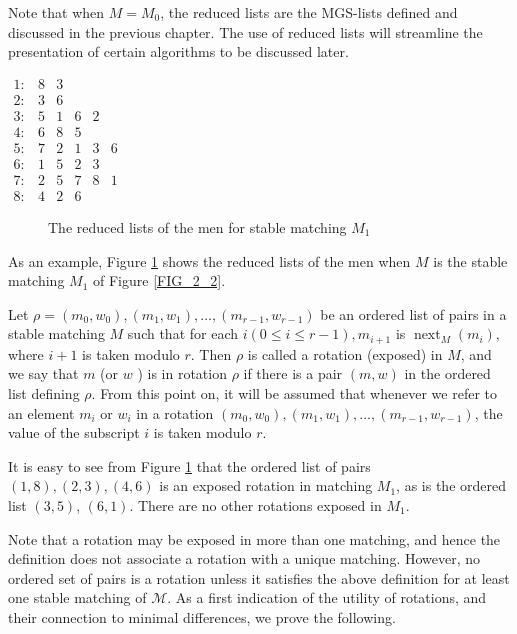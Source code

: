 Note that when $M=M_0$, the reduced lists are the MGS-lists defined and discussed in the previous chapter. The use of reduced lists will streamline the presentation of certain algorithms to be discussed later.

\begin{center}
    $\begin{array}{llllll}
    1: & 8 & 3 & & & \\ 2: & 3 & 6 & & & \\ 3: & 5 & 1 & 6 & 2 & \\ 4: & 6 & 8 & 5 & & \\ 5: & 7 & 2 & 1 & 3 & 6 \\ 6: & 1 & 5 & 2 & 3 &  \\ 7: & 2 & 5 & 7 & 8 & 1 \\ 8: & 4 & 2 & 6 & &\end{array}$
    \begin{figure}[ht]
  \centering
  \caption{The reduced lists of the men for stable matching $M_1$}
  \label{FIG_3_2}
\end{figure}
\end{center}

 As an example, Figure \ref{FIG_3_2} shows the reduced lists of the men when $M$ is the stable matching $M_1$ of Figure \ref{FIG_2_2}.

Let $\rho=\left(m_0, w_0\right),\left(m_1, w_1\right), \ldots,\left(m_{r-1}, w_{r-1}\right)$ be an ordered list of pairs in a stable matching $M$ such that for each $i(0 \leq i \leq r-1), m_{i+1}$ is $\operatorname{next}_M\left(m_i\right)$, where $i+1$ is taken modulo $r$. Then $\rho$ is called a rotation (exposed) in $M$, and we say that $m$ (or $w$ ) is in rotation $\rho$ if there is a pair $(m, w)$ in the ordered list defining $\rho$. From this point on, it will be assumed that whenever we refer to an element $m_i$ or $w_i$ in a rotation $\left(m_0, w_0\right),\left(m_1, w_1\right), \ldots,\left(m_{r-1}, w_{r-1}\right)$, the value of the subscript $i$ is taken modulo $r$.

\begin{exmp}\label{exmp_3_2}
    It is easy to see from Figure \ref{FIG_3_2} that the ordered list of pairs $(1,8),(2,3),(4,6)$ is an exposed rotation in matching $M_1$, as is the ordered list $(3,5)$, $(6,1)$. There are no other rotations exposed in $M_1$.
\end{exmp}

Note that a rotation may be exposed in more than one matching, and hence the definition does not associate a rotation with a unique matching. However, no ordered set of pairs is a rotation unless it satisfies the above definition for at least one stable matching of $\mathcal{M}$. As a first indication of the utility of rotations, and their connection to minimal differences, we prove the following.

